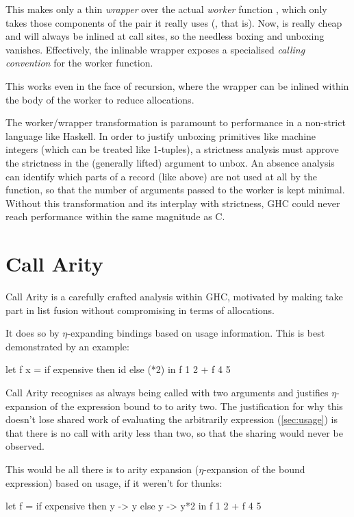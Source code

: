 This makes  only a thin \emph{wrapper} over the actual \emph{worker} function , which only takes those components of the pair it really uses (, that is).
Now,  is really cheap and will always be inlined at call sites, so the needless boxing and unboxing vanishes.
Effectively, the inlinable wrapper exposes a specialised \emph{calling convention} for the worker function.

This works even in the face of recursion, where the wrapper can be inlined within the body of the worker to reduce allocations.

The worker/wrapper transformation is paramount to performance in a non-strict language like Haskell. 
In order to justify unboxing primitives like machine integers (which can be treated like 1-tuples), a strictness analysis must approve the strictness in the (generally lifted) argument to unbox.
An absence analysis can identify which parts of a record (like  above) are not used at all by the function, so that the number of arguments passed to the worker is kept minimal.
Without this transformation and its interplay with strictness, GHC could never reach performance within the same magnitude as C.

\section{Call Arity}\label{sec:callarity}

Call Arity \parencite{callarity} is a carefully crafted analysis within GHC, motivated by making  take part in list fusion without compromising in terms of allocations.

It does so by $\eta$-expanding bindings based on usage information.
This is best demonstrated by an example:
\begin{haskellcode}
  let f x = 
        if expensive
        then id 
        else (*2)
  in f 1 2 + f 4 5
\end{haskellcode}

Call Arity recognises  as always being called with two arguments and justifies $\eta$-expansion of the expression bound to  to arity two.
The justification for why this doesn't lose shared work of evaluating the arbitrarily  expression (\cf \cref{sec:usage}) is that there is no call with arity less than two, so that the sharing would never be observed.

This would be all there is to arity expansion (\eg $\eta$-expansion of the bound expression) based on usage, if it weren't for thunks:
\begin{haskellcode}
  let f =
        if expensive
        then \x y -> y
        else \x y -> y*2
  in f 1 2 + f 4 5
\end{haskellcode}

